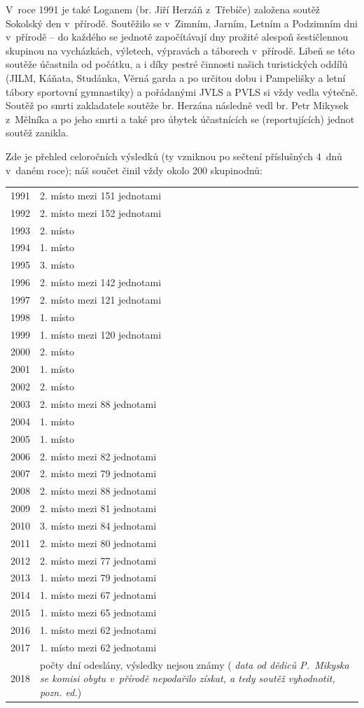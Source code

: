 \documentclass[a5paper, 11pt, twoside]{article}
\newcommand{\pozned}[1]{%
\textit{#1}}
\begin{document}
V~roce 1991 je také Loganem (br. Jiří Herzáň z~Třebíče) založena soutěž
Sokolský den v~přírodě. Soutěžilo se v~Zimním, Jarním, Letním a
Podzimním dni v~přírodě -- do každého se jednotě započítávají dny
prožité alespoň šestičlennou skupinou na vycházkách, výletech, výpravách
a táborech v~přírodě. Libeň se této soutěže účastnila od počátku, a i
díky pestré činnosti našich turistických oddílů (JILM, Káňata, Studánka,
Věrná garda a po určitou dobu i Pampelišky a letní tábory sportovní
gymnastiky) a pořádanými JVLS a PVLS si vždy vedla výtečně. Soutěž po
smrti zakladatele soutěže br. Herzána následně vedl br. Petr Mikysek
z~Mělníka a po jeho smrti a také pro úbytek účastnících se (reportujících)
jednot soutěž zanikla.

{\sloppy Zde je přehled celoročních výsledků (ty vzniknou po sečtení příslušných 4~dnů v~daném roce); náš součet činil vždy okolo 200 skupinodnů: \par}

\vspace*{-6pt}
\renewcommand{\arraystretch}{1}
\begin{longtable}{l p{10.2cm}}
1991 & 2. místo mezi 151 jednotami \\
1992 & 2. místo mezi 152 jednotami \\
1993 & 2. místo \\
1994 & 1. místo \\
1995 & 3. místo \\
1996 & 2. místo mezi 142 jednotami \\
1997 & 2. místo mezi 121 jednotami \\
1998 & 1. místo \\
1999 & 1. místo mezi 120 jednotami \\
2000 & 2. místo \\
2001 & 1. místo \\
2002 & 2. místo \\
2003 & 2. místo mezi 88 jednotami \\
2004 & 1. místo \\
2005 & 1. místo \\
2006 & 2. místo mezi 82 jednotami \\
2007 & 2. místo mezi 79 jednotami \\
2008 & 2. místo mezi 88 jednotami \\
2009 & 2. místo mezi 81 jednotami \\
2010 & 3. místo mezi 84 jednotami \\
2011 & 2. místo mezi 80 jednotami \\
2012 & 2. místo mezi 77 jednotami \\
2013 & 1. místo mezi 79 jednotami \\
2014 & 1. místo mezi 67 jednotami \\
2015 & 1. místo mezi 65 jednotami \\
2016 & 1. místo mezi 62 jednotami \\
2017 & 1. místo mezi 62 jednotami \\
2018 & počty dní odeslány, výsledky nejsou známy (\pozned{data od dědiců P.~Mikyska se komisi obytu v~přírodě nepodařilo získat, a tedy soutěž vyhodnotit, pozn. ed.}) \\
\end{longtable}
\end{document}

